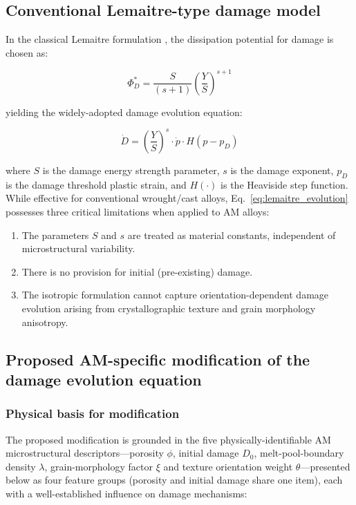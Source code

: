\documentclass[twocolumn]{sagej}
\begin{document}
\subsection{Conventional Lemaitre-type damage model}

In the classical Lemaitre formulation \cite{lemaitre1985continuous}, the dissipation potential for damage is chosen as:

\begin{equation}
\Phi^*_D = \frac{S}{(s+1)}\left(\frac{Y}{S}\right)^{s+1}
\label{eq:lemaitre_potential}
\end{equation}

yielding the widely-adopted damage evolution equation:

\begin{equation}
\dot{D} = \left(\frac{Y}{S}\right)^s \cdot \dot{p} \cdot H(p - p_D)
\label{eq:lemaitre_evolution}
\end{equation}

where $S$ is the damage energy strength parameter, $s$ is the damage exponent, $p_D$ is the damage threshold plastic strain, and $H(\cdot)$ is the Heaviside step function. While effective for conventional wrought/cast alloys, Eq.~\eqref{eq:lemaitre_evolution} possesses three critical limitations when applied to AM alloys:

\begin{enumerate}\def\labelenumi{(\roman{enumi})}
    \item The parameters $S$ and $s$ are treated as material constants, independent of microstructural variability.
    \item There is no provision for initial (pre-existing) damage.
    \item The isotropic formulation cannot capture orientation-dependent damage evolution arising from crystallographic texture and grain morphology anisotropy.
\end{enumerate}

\subsection{Proposed AM-specific modification of the damage evolution equation}
\label{sec:am_modification}

\subsubsection{Physical basis for modification}

The proposed modification is grounded in the five physically-identifiable AM microstructural descriptors---porosity $\phi$, initial damage $D_0$, melt-pool-boundary density $\lambda$, grain-morphology factor $\xi$ and texture orientation weight $\theta$---presented below as four feature groups (porosity and initial damage share one item), each with a well-established influence on damage mechanisms:
\end{document}
